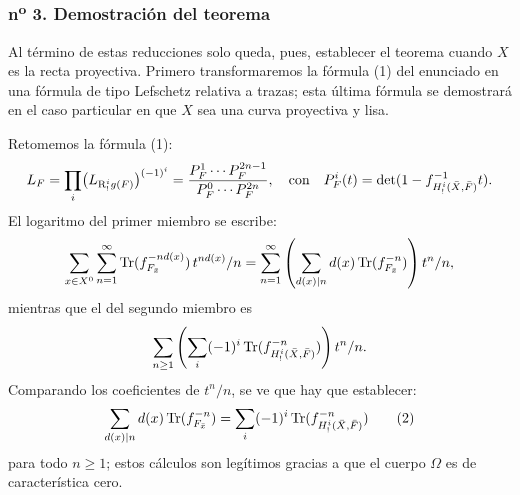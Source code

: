 \subsubsection*{n\textsuperscript{o} 3. Demostración del teorema}

Al término de estas reducciones solo queda, pues, establecer el teorema cuando $X$ es la recta proyectiva. Primero transformaremos la fórmula (1) del enunciado en una fórmula de tipo Lefschetz relativa a trazas; esta última fórmula se demostrará en el caso particular en que $X$ sea una curva proyectiva y lisa.

Retomemos la fórmula (1):
\[
L_F=\prod_i\bigl(L_{\mathrm{R}^i_!g(F)}\bigr)^{(-1)^i}
=\frac{P_F^1\cdots P_F^{2n-1}}{P_F^0\cdots P_F^{2n}},
\quad\text{con}\quad
P_F^i(t)=\det(1-f^{-1}_{H^i_!(\bar X,\bar F)}t).
\]
El logaritmo del primer miembro se escribe:
\[
\sum_{x\in X^0}\sum_{n=1}^{\infty}\operatorname{Tr}(f_{F_{\bar x}}^{-n d(x)})\,t^{n d(x)}/n
=\sum_{n=1}^{\infty}\left(\sum_{d(x)|n} d(x)\operatorname{Tr}(f_{F_{\bar x}}^{-n})\right)t^n/n,
\]
mientras que el del segundo miembro es
\[
\sum_{n\ge1}\left(\sum_i(-1)^i\operatorname{Tr}(f^{-n}_{H^i_!(\bar X,\bar F)})\right)t^n/n.
\]
Comparando los coeficientes de $t^n/n$, se ve que hay que establecer:
\[
\sum_{d(x)|n}d(x)\operatorname{Tr}(f_{F_{\bar x}}^{-n})
=\sum_i(-1)^i\operatorname{Tr}(f^{-n}_{H^i_!(\bar X,\bar F)})
\tag{2}
\]
para todo $n\ge1$; estos cálculos son legítimos gracias a que el cuerpo $\Omega$ es de característica cero.
